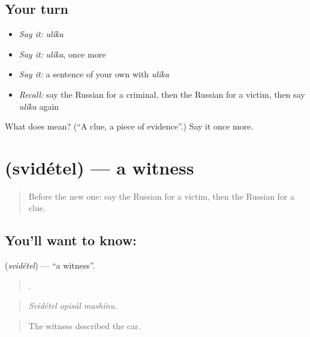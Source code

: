 \subsection*{Your turn}
\begin{itemize}
\raggedright
  \item \emph{Say it:} \emph{ulíka}
  \item \emph{Say it:} \emph{ulíka}, once more
  \item \emph{Say it:} a sentence of your own with \emph{ulíka}
  \item \emph{Recall:} say the Russian for a criminal, then the Russian for a victim, then say \emph{ulíka} again
\end{itemize}

\begin{tcolorbox}[breakable,colback=teal!4,colframe=teal!35!black,title={Before you move on}]
What does  mean? (\textquotedblleft{}A clue, a piece of evidence\textquotedblright{}.) Say it once more.
\end{tcolorbox}
\section[\texorpdfstring{\ru{свидетель} (svidétel)}{свидетель (svidétel)}]{ (svidétel) — a witness}

\label{lesson:RU-C287-svidetel}



\begin{quote}
Before the new one: say the Russian for a victim, then the Russian for a clue.
\end{quote}

\subsection*{You'll want to know: }
\textbf{} (\emph{svidétel}) — \textquotedblleft{}a witness\textquotedblright{}.

\begin{quote}
  .
\end{quote}

\begin{quote}
\emph{Svidétel opisál mashínu.}
\end{quote}

\begin{quote}
The witness described the car.
\end{quote}

